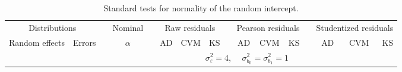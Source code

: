 \begin{table}[ht]
\begin{scriptsize}
\begin{center}
\begin{tabular}{ll p{.1cm} c p{.1cm} rrr p{.1cm} rrr p{.1cm} rrr}
   \hline
\end{tabular}
\end{center}
\end{scriptsize}
\end{table}

\begin{table}[ht]
\caption{\label{tab:evalb0}Standard tests for normality of the random intercept.}
\begin{scriptsize}
\begin{center}
\begin{tabular}{ll p{.1cm} c p{.1cm} rrr p{.1cm} rrr p{.1cm} rrr}
  \hline
  \multicolumn{2}{c}{Distributions}& & Nominal & &  \multicolumn{3}{c}{Raw residuals} & & \multicolumn{3}{c}{Pearson residuals} & & \multicolumn{3}{c}{Studentized residuals}\\ \cline{1-2} \cline{6-8} \cline{10-12} \cline{14-16}
  Random effects & Errors & & $\alpha$ & & AD & CVM & KS & & AD & CVM & KS & & AD & CVM & KS \\ 
   \hline
& && && \multicolumn{9}{c}{$\sigma_{\varepsilon}^2 = 4$, \ \ $\sigma_{b_0}^2 = \sigma_{b_1}^2 = 1$} \\ \cline{6-16}


\end{tabular}
\end{center}
\end{scriptsize}
\end{table}
